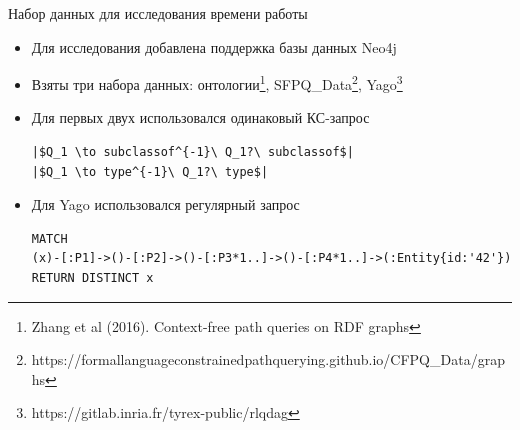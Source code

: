 \documentclass[aspectratio=169]{beamer}
\begin{document}
\begin{frame}[fragile]{Набор данных для исследования времени работы}
  \begin{itemize}
    \item Для исследования добавлена поддержка базы данных Neo4j
    \item Взяты три набора данных: онтологии\footnote[1]{Zhang et al (2016). Context-free path queries on RDF graphs}, SFPQ\_Data\footnote[2]{https://formallanguageconstrainedpathquerying.github.io/CFPQ\_Data/graphs}, Yago\footnote[3]{https://gitlab.inria.fr/tyrex-public/rlqdag}
    \item Для первых двух использовался одинаковый КС-запрос
          \begin{verbatim}
|$Q_1 \to subclassof^{-1}\ Q_1?\ subclassof$|
|$Q_1 \to type^{-1}\ Q_1?\ type$|
\end{verbatim}
    \item Для Yago использовался регулярный запрос
          \begin{verbatim}
MATCH 
(x)-[:P1]->()-[:P2]->()-[:P3*1..]->()-[:P4*1..]->(:Entity{id:'42'}) 
RETURN DISTINCT x
\end{verbatim}
  \end{itemize}

\end{frame}


\end{document}
